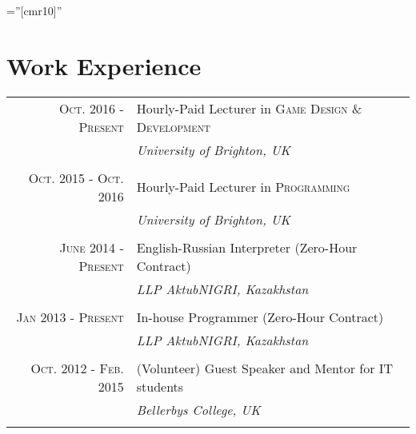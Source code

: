 \documentclass[a4paper,10pt]{article} %
\begin{document}
\pagestyle{empty} %

\font\fb=''[cmr10]'' %


\par{\bigskip\par} %


\section{Work Experience}

\begin{tabular}{r|p{11cm}}

\textsc{Oct. 2016 - Present} & Hourly-Paid Lecturer in \textsc{Game Design \& Development}\\
& \emph{University of Brighton, UK}\\
\multicolumn{2}{c}{} \\


\textsc{Oct. 2015 - Oct. 2016} & Hourly-Paid Lecturer in \textsc{Programming}\\
& \emph{University of Brighton, UK}\\
\multicolumn{2}{c}{} \\


\textsc{June 2014 - Present} & English-Russian Interpreter (Zero-Hour Contract)\\
& \emph{LLP AktubNIGRI, Kazakhstan}\\
\multicolumn{2}{c}{} \\


\textsc{Jan 2013 - Present} & In-house Programmer (Zero-Hour Contract)\\
& \emph{LLP AktubNIGRI, Kazakhstan}\\
\multicolumn{2}{c}{} \\


\textsc{Oct. 2012 - Feb. 2015} & (Volunteer) Guest Speaker and Mentor for IT students\\
& \emph{Bellerbys College, UK}\\
\multicolumn{2}{c}{} \\

\end{tabular}
\vspace{0.1cm}
\end{document}
